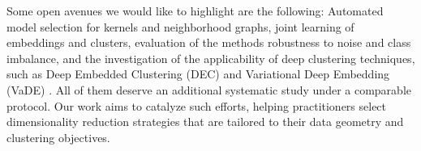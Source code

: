\documentclass[preprint,12pt]{elsarticle}
\begin{document}

Some open avenues we would like to highlight are the following: Automated model selection for kernels and neighborhood graphs, joint learning of embeddings and clusters, evaluation of the methods robustness to noise and class imbalance, %
and the investigation of the applicability of deep clustering techniques, such as Deep Embedded Clustering (DEC) \cite{xie2016unsupervised} and Variational Deep Embedding (VaDE) \cite{jiang2016variational}. All of them deserve an additional systematic study under a comparable protocol. Our work aims to catalyze such efforts, helping practitioners select 
dimensionality reduction strategies that are tailored to their data geometry and clustering objectives. 


%
%
\end{document}
